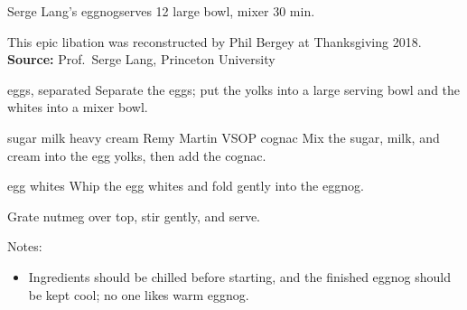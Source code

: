 \begin{recipe}{Serge Lang's eggnog}{serves 12}{ \hfill large bowl, mixer \hfill 30 min.}

 \freeform This epic libation was reconstructed by Phil Bergey at Thanksgiving 2018.
 \textbf{Source:} Prof.\ Serge Lang, Princeton University

 \ing[12]{} {eggs, separated}
 Separate the eggs; put the yolks into a large serving bowl and the whites into a mixer bowl.

  {sugar}
  {milk}
  {heavy cream}
  {Remy Martin VSOP cognac}
 Mix the sugar, milk, and cream into the egg yolks, then add the cognac.

 \ing[12]{} {egg whites}
 Whip the egg whites and fold gently into the eggnog.

 Grate nutmeg over top, stir gently, and serve.

 \freeform Notes:
 \begin{itemize}
  \item Ingredients should be chilled before starting, and the finished eggnog should be kept cool; no one likes warm eggnog.
 \end{itemize}

\end{recipe}
